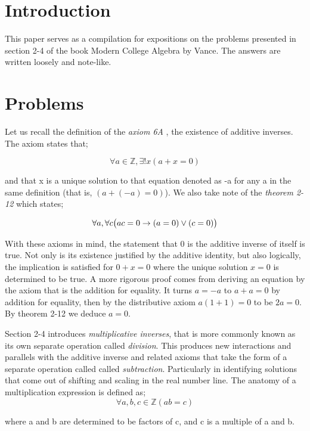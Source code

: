 \documentclass{article}
\newcommand{\paren}[1]{\mathopen{}\left( {#1}_{{}_{}}\,\negthickspace\right)\mathclose{}} %
\begin{document}
\section{Introduction}

This paper serves as a compilation for expositions on the problems presented in section
2-4 of the book Modern College Algebra by Vance. The answers are written loosely 
and note-like.

\section{Problems}

Let us recall the definition of the \emph{axiom 6A} , the existence of additive 
inverses. The axiom states that;

\[
    \forall a \in \mathbb{Z}, \exists !x \left( a + x = 0\right)
\]

and that x is a unique solution to that equation denoted as -a for any a in the
 same definition (that is, \(\left(a + (-a) = 0\right)\)). We also take note of the \emph{theorem 2-12} which states; 

\[
    \forall a, \forall c \paren{ ac =  0 \to (a= 0 )\lor(c = 0)}
\] 

With these axioms in mind, the statement that 0 is the additive inverse of itself is 
true. Not only is its existence justified by the additive identity, but also 
logically, the implication is satisfied for \(0 + x = 0\) where the unique 
solution \(x = 0\) is determined to be true. A more rigorous proof comes from 
deriving an equation by the axiom that is the addition for equality. It turns 
\(a = -a\) to \(a +a = 0\) by addition for equality, then by the distributive 
axiom \(a(1 + 1)  =0\) to be \(2a = 0\). By theorem 2-12 we deduce \(a = 0\).

Section 2-4 introduces \emph{multiplicative inverses}, that is more commonly known as its
own separate operation called \emph{division}. This produces new interactions and parallels
with the additive inverse and related axioms that take the form of a separate operation called 
called \emph{subtraction}. Particularly in identifying solutions that come out of shifting and
scaling in the real number line. The anatomy of a multiplication expression is defined as;
\[
    \forall a, b, c \in \mathbb{Z} \left(ab = c \right)
\]
\begin{center}
    where a and b are determined to be factors of c, and c is a multiple of a and b.
\end{center}
\end{document}
